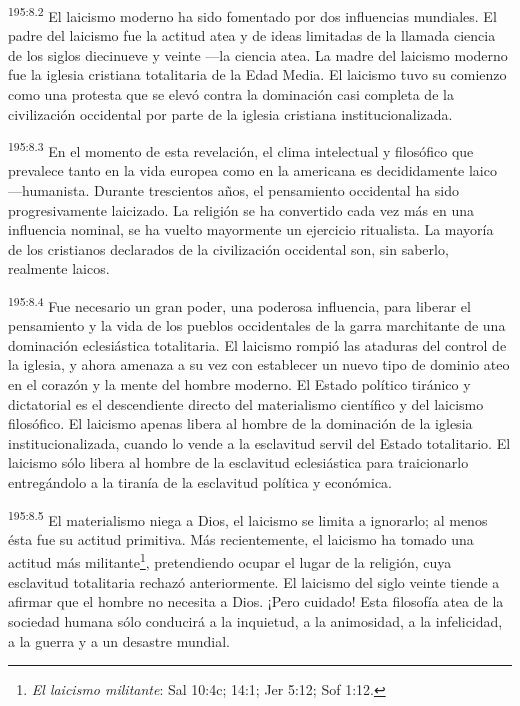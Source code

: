 \par 
\textsuperscript{195:8.2} El laicismo moderno ha sido fomentado por dos influencias mundiales. El padre del laicismo fue la actitud atea y de ideas limitadas de la llamada ciencia de los siglos diecinueve y veinte ---la ciencia atea. La madre del laicismo moderno fue la iglesia cristiana totalitaria de la Edad Media. El laicismo tuvo su comienzo como una protesta que se elevó contra la dominación casi completa de la civilización occidental por parte de la iglesia cristiana institucionalizada.

\par 
\textsuperscript{195:8.3} En el momento de esta revelación, el clima intelectual y filosófico que prevalece tanto en la vida europea como en la americana es decididamente laico ---humanista. Durante trescientos años, el pensamiento occidental ha sido progresivamente laicizado. La religión se ha convertido cada vez más en una influencia nominal, se ha vuelto mayormente un ejercicio ritualista. La mayoría de los cristianos declarados de la civilización occidental son, sin saberlo, realmente laicos.

\par 
\textsuperscript{195:8.4} Fue necesario un gran poder, una poderosa influencia, para liberar el pensamiento y la vida de los pueblos occidentales de la garra marchitante de una dominación eclesiástica totalitaria. El laicismo rompió las ataduras del control de la iglesia, y ahora amenaza a su vez con establecer un nuevo tipo de dominio ateo en el corazón y la mente del hombre moderno. El Estado político tiránico y dictatorial es el descendiente directo del materialismo científico y del laicismo filosófico. El laicismo apenas libera al hombre de la dominación de la iglesia institucionalizada, cuando lo vende a la esclavitud servil del Estado totalitario. El laicismo sólo libera al hombre de la esclavitud eclesiástica para traicionarlo entregándolo a la tiranía de la esclavitud política y económica.

\par 
\textsuperscript{195:8.5} El materialismo niega a Dios, el laicismo se limita a ignorarlo; al menos ésta fue su actitud primitiva. Más recientemente, el laicismo ha tomado una actitud más militante\footnote{\textit{El laicismo militante}: Sal 10:4c; 14:1; Jer 5:12; Sof 1:12.}, pretendiendo ocupar el lugar de la religión, cuya esclavitud totalitaria rechazó anteriormente. El laicismo del siglo veinte tiende a afirmar que el hombre no necesita a Dios. ¡Pero cuidado! Esta filosofía atea de la sociedad humana sólo conducirá a la inquietud, a la animosidad, a la infelicidad, a la guerra y a un desastre mundial.

